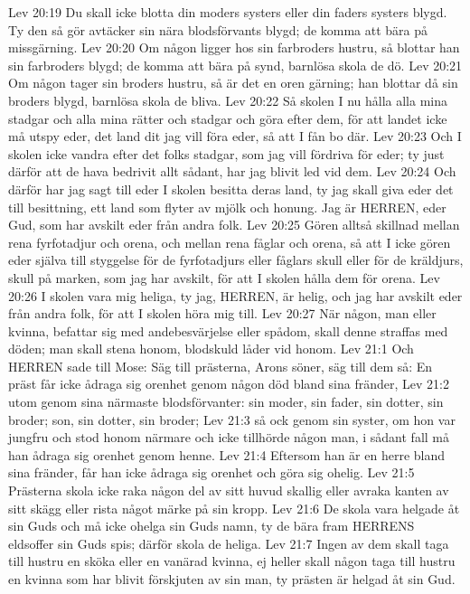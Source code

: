 Lev 20:19  Du skall icke blotta din moders systers eller din faders systers blygd. Ty den så gör avtäcker sin nära blodsförvants blygd; de komma att bära på missgärning.
Lev 20:20  Om någon ligger hos sin farbroders hustru, så blottar han sin farbroders blygd; de komma att bära på synd, barnlösa skola de dö.
Lev 20:21  Om någon tager sin broders hustru, så är det en oren gärning; han blottar då sin broders blygd, barnlösa skola de bliva.
Lev 20:22  Så skolen I nu hålla alla mina stadgar och alla mina rätter och stadgar och göra efter dem, för att landet icke må utspy eder, det land dit jag vill föra eder, så att I fån bo där.
Lev 20:23  Och I skolen icke vandra efter det folks stadgar, som jag vill fördriva för eder; ty just därför att de hava bedrivit allt sådant, har jag blivit led vid dem.
Lev 20:24  Och därför har jag sagt till eder I skolen besitta deras land, ty jag skall giva eder det till besittning, ett land som flyter av mjölk och honung. Jag är HERREN, eder Gud, som har avskilt eder från andra folk.
Lev 20:25  Gören alltså skillnad mellan rena fyrfotadjur och orena, och mellan rena fåglar och orena, så att I icke gören eder själva till styggelse för de fyrfotadjurs eller fåglars skull eller för de kräldjurs, skull på marken, som jag har avskilt, för att I skolen hålla dem för orena.
Lev 20:26  I skolen vara mig heliga, ty jag, HERREN, är helig, och jag har avskilt eder från andra folk, för att I skolen höra mig till.
Lev 20:27  När någon, man eller kvinna, befattar sig med andebesvärjelse eller spådom, skall denne straffas med döden; man skall stena honom, blodskuld låder vid honom.
Lev 21:1  Och HERREN sade till Mose: Säg till prästerna, Arons söner, säg till dem så: En präst får icke ådraga sig orenhet genom någon död bland sina fränder,
Lev 21:2  utom genom sina närmaste blodsförvanter: sin moder, sin fader, sin dotter, sin broder; son, sin dotter, sin broder;
Lev 21:3  så ock genom sin syster, om hon var jungfru och stod honom närmare och icke tillhörde någon man, i sådant fall må han ådraga sig orenhet genom henne.
Lev 21:4  Eftersom han är en herre bland sina fränder, får han icke ådraga sig orenhet och göra sig ohelig.
Lev 21:5  Prästerna skola icke raka någon del av sitt huvud skallig eller avraka kanten av sitt skägg eller rista något märke på sin kropp.
Lev 21:6  De skola vara helgade åt sin Guds och må icke ohelga sin Guds namn, ty de bära fram HERRENS eldsoffer sin Guds spis; därför skola de heliga.
Lev 21:7  Ingen av dem skall taga till hustru en sköka eller en vanärad kvinna, ej heller skall någon taga till hustru en kvinna som har blivit förskjuten av sin man, ty prästen är helgad åt sin Gud.
